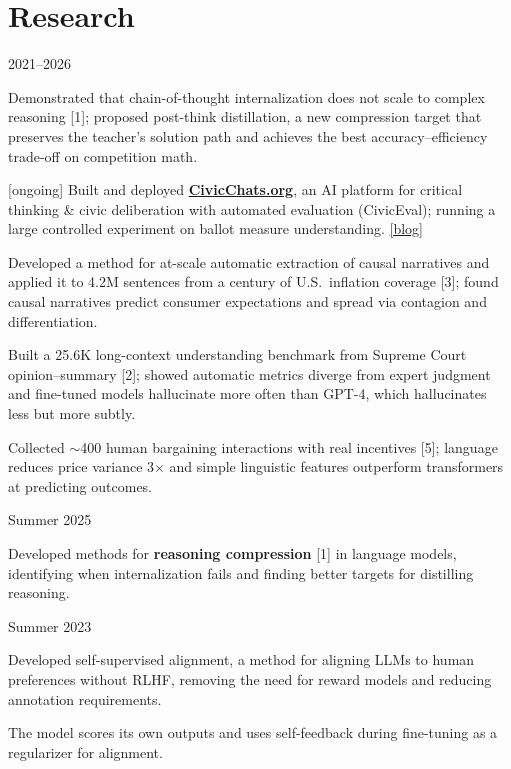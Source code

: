 \documentclass[11pt,letterpaper]{article}
\begin{document}
\section*{Research}
\vspace{4pt}
 \hfill 2021--2026
\begin{cvitems}
    \item Demonstrated that chain-of-thought internalization does not scale to complex reasoning [1]; proposed post-think distillation, a new compression target that preserves the teacher's solution path and achieves the best accuracy--efficiency trade-off on competition math.
    \item {[ongoing]} Built and deployed \href{https://civicchats.org}{\textbf{CivicChats.org}}, an AI platform for critical thinking \& civic deliberation with automated evaluation (CivicEval); running a large controlled experiment on ballot measure understanding. \href{https://open.substack.com/pub/cichicago/p/civicchats-building-ai-to-support}{[blog]}
    \item Developed a method for at-scale automatic extraction of causal narratives and applied it to 4.2M sentences from a century of U.S.\ inflation coverage [3]; found causal narratives predict consumer expectations and spread via contagion and differentiation.
    \item Built a 25.6K long-context understanding benchmark from Supreme Court opinion--summary [2]; showed automatic metrics diverge from expert judgment and fine-tuned models hallucinate more often than GPT-4, which hallucinates less but more subtly.
    \item Collected $\sim$400 human bargaining interactions with real incentives [5]; language reduces price variance 3$\times$ and simple linguistic features outperform transformers at predicting outcomes.
\end{cvitems}

\vspace{4pt}
 \hfill Summer 2025
\begin{cvitems}
    \item Developed methods for \textbf{reasoning compression} [1] in language models, identifying when internalization fails and finding better targets for distilling reasoning.
\end{cvitems}

\vspace{4pt}
 \hfill Summer 2023
\begin{cvitems}
    \item Developed self-supervised alignment, a method for aligning LLMs to human preferences without RLHF, removing the need for reward models and reducing annotation requirements.
    \item The model scores its own outputs and uses self-feedback during fine-tuning as a regularizer for alignment.
\end{cvitems}
\end{document}
